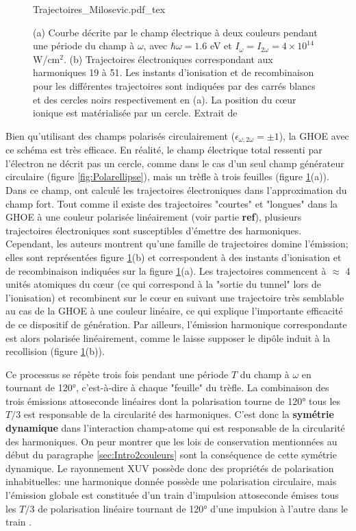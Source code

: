 \begin{figure}[ht]
\centering
\def\svgwidth{\textwidth}
{Trajectoires_Milosevic.pdf_tex}
\caption{(a) Courbe décrite par le champ électrique à deux couleurs pendant une période du champ à $\omega$, avec $\hbar \omega = 1.6$ eV et $I_{\omega} = I_{2\omega} = 4 \times 10^{14}$ W/cm$^2$. (b) Trajectoires électroniques correspondant aux harmoniques 19 à 51. Les instants d'ionisation et de recombinaison pour les différentes trajectoires sont indiquées par des carrés blancs et des cercles noirs respectivement en (a). La position du c\oe ur ionique est matérialisée par un cercle. Extrait de }
\label{fig:Trajectoires_Milosevic}
\end{figure}

Bien qu'utilisant des champs polarisés circulairement ($\epsilon_{\omega, 2\omega} = \pm 1$), la GHOE avec ce schéma est très efficace. En réalité, le champ électrique total ressenti par l'électron ne décrit pas un cercle, comme dans le cas d'un seul champ générateur circulaire (figure \ref{fig:Polarellipse}), mais un trèfle à trois feuilles (figure \ref{fig:Trajectoires_Milosevic}(a)). Dans ce champ,  ont calculé les trajectoires électroniques dans l'approximation du champ fort. Tout comme il existe des trajectoires "courtes" et "longues" dans la GHOE à une couleur polarisée linéairement (voir partie \textbf{ref}), plusieurs trajectoires électroniques sont susceptibles d'émettre des harmoniques. Cependant, les auteurs montrent qu'une famille de trajectoires domine l'émission; elles sont représentées figure \ref{fig:Trajectoires_Milosevic}(b) et correspondent à des instants d'ionisation et de recombinaison indiquées sur la figure \ref{fig:Trajectoires_Milosevic}(a). Les trajectoires commencent à $\approx$ 4 unités atomiques du c\oe ur (ce qui correspond à la "sortie du tunnel" lors de l'ionisation) et recombinent sur le c\oe ur en suivant une trajectoire très semblable au cas de la GHOE à une couleur linéaire, ce qui explique l'importante efficacité de ce dispositif de génération. Par ailleurs, l'émission harmonique correspondante est alors polarisée linéairement, comme le laisse supposer le dipôle induit à la recollision (figure \ref{fig:Trajectoires_Milosevic}(b)). 

Ce processus se répète trois fois pendant une période $T$ du champ à $\omega$ en tournant de 120°, c'est-à-dire à chaque "feuille" du trèfle. La combinaison des trois émissions attoseconde linéaires dont la polarisation tourne de 120° tous les $T/3$ est responsable de la circularité des harmoniques. C'est donc la \textbf{symétrie dynamique} dans l'interaction champ-atome qui est responsable de la circularité des harmoniques. On peur montrer que les lois de conservation mentionnées au début du paragraphe \ref{sec:Intro2couleurs} sont la conséquence de cette symétrie dynamique. Le rayonnement XUV possède donc des propriétés de polarisation inhabituelles: une harmonique donnée possède une polarisation circulaire, mais l'émission globale est constituée d'un train d'impulsion attoseconde émises tous les $T/3$ de polarisation linéaire tournant de 120° d'une impulsion à l'autre dans le train .

